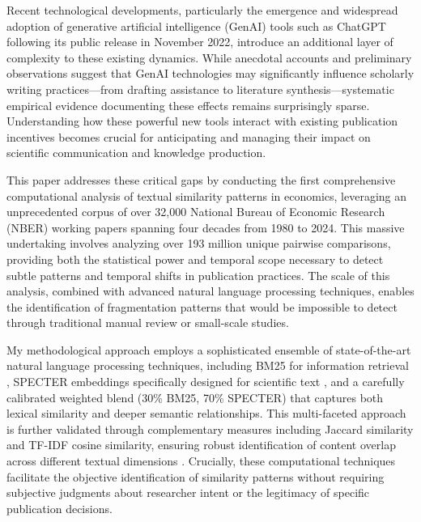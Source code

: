\documentclass[12pt]{article}
\begin{document}
Recent technological developments, particularly the emergence and widespread adoption of generative artificial intelligence (GenAI) tools such as ChatGPT following its public release in November 2022, introduce an additional layer of complexity to these existing dynamics. While anecdotal accounts and preliminary observations suggest that GenAI technologies may significantly influence scholarly writing practices—from drafting assistance to literature synthesis—systematic empirical evidence documenting these effects remains surprisingly sparse. Understanding how these powerful new tools interact with existing publication incentives becomes crucial for anticipating and managing their impact on scientific communication and knowledge production.

This paper addresses these critical gaps by conducting the first comprehensive computational analysis of textual similarity patterns in economics, leveraging an unprecedented corpus of over 32,000 National Bureau of Economic Research (NBER) working papers spanning four decades from 1980 to 2024. This massive undertaking involves analyzing over 193 million unique pairwise comparisons, providing both the statistical power and temporal scope necessary to detect subtle patterns and temporal shifts in publication practices. The scale of this analysis, combined with advanced natural language processing techniques, enables the identification of fragmentation patterns that would be impossible to detect through traditional manual review or small-scale studies.

My methodological approach employs a sophisticated ensemble of state-of-the-art natural language processing techniques, including BM25 for information retrieval \citep{li2022bm25}, SPECTER embeddings specifically designed for scientific text \citep{beltagy2019scibert}, and a carefully calibrated weighted blend (30\% BM25, 70\% SPECTER) that captures both lexical similarity and deeper semantic relationships. This multi-faceted approach is further validated through complementary measures including Jaccard similarity and TF-IDF cosine similarity, ensuring robust identification of content overlap across different textual dimensions \citep{liu2021similarity, zhang2022plagiarism, davidson2021mapping}. Crucially, these computational techniques facilitate the objective identification of similarity patterns without requiring subjective judgments about researcher intent or the legitimacy of specific publication decisions.
\end{document}
